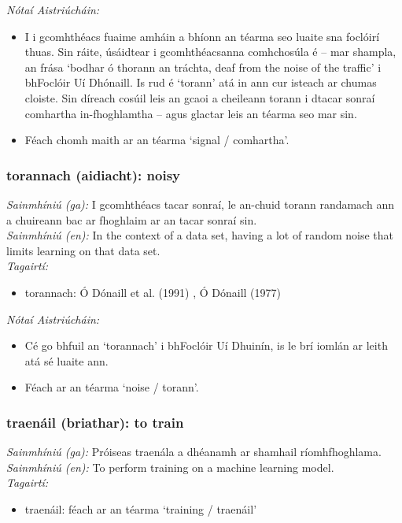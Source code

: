  \noindent \textit{Nótaí Aistriúcháin:}
\begin{itemize}
	\item I i gcomhthéacs fuaime amháin a bhíonn an téarma seo luaite sna foclóirí thuas. Sin ráite, úsáidtear i gcomhthéacsanna comhchosúla é -- mar shampla, an frása `bodhar ó thorann an tráchta, deaf from the noise of the traffic' i bhFoclóir Uí Dhónaill. Is rud é `torann' atá in ann cur isteach ar chumas cloiste. Sin díreach cosúil leis an gcaoi a cheileann torann i dtacar sonraí comhartha in-fhoghlamtha -- agus glactar leis an téarma seo mar sin.
	\item Féach chomh maith ar an téarma `signal / comhartha'.
\end{itemize}


\subsubsection*{torannach (aidiacht): noisy}
 \noindent \textit{Sainmhíniú (ga):} I gcomhthéacs tacar sonraí, le an-chuid torann randamach ann a chuireann bac ar fhoghlaim ar an tacar sonraí sin.
\\
 \noindent \textit{Sainmhíniú (en):} In the context of a data set, having a lot of random noise that limits learning on that data set.
\\
 \noindent \textit{Tagairtí:}
\begin{itemize}
	\item torannach: Ó Dónaill et al. (1991) \cite{focloir-beag}, Ó Dónaill (1977) \cite{odonaill}
\end{itemize}

 \noindent \textit{Nótaí Aistriúcháin:}
\begin{itemize}
	\item Cé go bhfuil an `torannach' i bhFoclóir Uí Dhuinín, is le brí iomlán ar leith atá sé luaite ann.
	\item Féach ar an téarma `noise / torann'.
\end{itemize}


\subsubsection*{traenáil (briathar): to train}
 \noindent \textit{Sainmhíniú (ga):} Próiseas traenála a dhéanamh ar shamhail ríomhfhoghlama.
\\
 \noindent \textit{Sainmhíniú (en):} To perform training on a machine learning model.
\\
 \noindent \textit{Tagairtí:}
\begin{itemize}
	\item traenáil: féach ar an téarma `training / traenáil'
\end{itemize}

